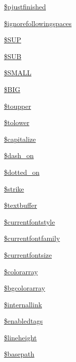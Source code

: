 \begin{DoxyCompactItemize}
\hyperlink{classm_p_d_f_ab098af7f4df11b4a22d15a7cbf4f7aaf}{\$pjustfinished}
\item 
\hyperlink{classm_p_d_f_aa94c2091442d78edc77e1e706187f295}{\$ignorefollowingspaces}
\item 
\hyperlink{classm_p_d_f_acd3bea7a4a34d9da01a427567aef7ba6}{\$\-S\-U\-P}
\item 
\hyperlink{classm_p_d_f_a7715c7b45fc04939679263e8e7009208}{\$\-S\-U\-B}
\item 
\hyperlink{classm_p_d_f_abe4b5b714940c02912e59c6584ee1801}{\$\-S\-M\-A\-L\-L}
\item 
\hyperlink{classm_p_d_f_aeb039c11cd29b20354c980a34f46f2a4}{\$\-B\-I\-G}
\item 
\hyperlink{classm_p_d_f_aafb2a620cfa9060bf73aa9c0754187b7}{\$toupper}
\item 
\hyperlink{classm_p_d_f_afb2b28504c28ce77f9a2872b686eaa99}{\$tolower}
\item 
\hyperlink{classm_p_d_f_a060f03be66dc148a5ed8f4e3c371dc28}{\$capitalize}
\item 
\hyperlink{classm_p_d_f_ac03fb4d5c4af846f1f8485b8ca0f9c6b}{\$dash\-\_\-on}
\item 
\hyperlink{classm_p_d_f_ad777109a28d0849c48c101ff01d83a6e}{\$dotted\-\_\-on}
\item 
\hyperlink{classm_p_d_f_a4fb560ac09d95cb64c601c6434f6bf6e}{\$strike}
\item 
\hyperlink{classm_p_d_f_adbb71d5b8474bc277f64422b8458cb66}{\$textbuffer}
\item 
\hyperlink{classm_p_d_f_afb6c692d8c6b059240058cf637af4c84}{\$currentfontstyle}
\item 
\hyperlink{classm_p_d_f_aeda5fa7ef1a217299d1a05a4f55fea20}{\$currentfontfamily}
\item 
\hyperlink{classm_p_d_f_aded68726702d8646674f5941816cb706}{\$currentfontsize}
\item 
\hyperlink{classm_p_d_f_a4d1a8f4520b777359cf585e8e0dcaa63}{\$colorarray}
\item 
\hyperlink{classm_p_d_f_aef1d1b23b5db547804d110f1d3207e02}{\$bgcolorarray}
\item 
\hyperlink{classm_p_d_f_a71429a36c210dbf387e2155bd65da18d}{\$internallink}
\item 
\hyperlink{classm_p_d_f_ac1173d37418aa43afa7ca49de50d0f2c}{\$enabledtags}
\item 
\hyperlink{classm_p_d_f_a7426e92bb21c0267afc619d5d3a6071a}{\$lineheight}
\item 
\hyperlink{classm_p_d_f_a1f5531ab58aaca68a634d54638edd76f}{\$basepath}

\end{DoxyCompactItemize}

